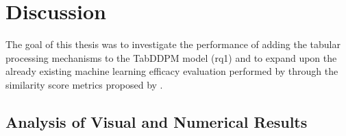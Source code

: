\newpage
\section{Discussion}
\label{ch:results-discussion}
The goal of this thesis was to investigate the performance of adding the tabular processing mechanisms to the TabDDPM model (\gls{rq}1) and
to expand upon the already existing machine learning efficacy evaluation performed by \cite{kotelnikov2022TabDDPMModellingTabular} through the similarity score metrics proposed by \cite{chundawat2022UniversalMetricRobust}.

\subsection*{Analysis of Visual and Numerical Results}

